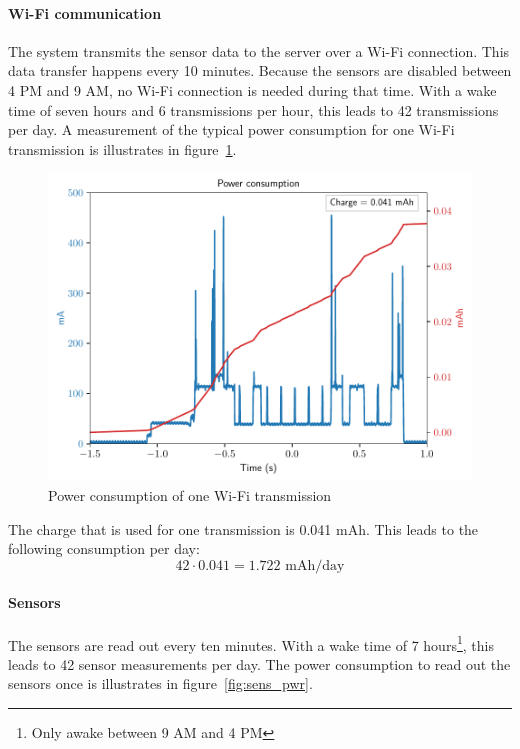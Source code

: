 \documentclass[11pt,a4paper]{article}
\begin{document}
\paragraph{Wi-Fi communication}
The system transmits the sensor data to the server over a Wi-Fi connection. This data transfer happens every 10 minutes. Because the sensors are disabled between 4 PM and 9 AM, no Wi-Fi connection is needed during that time. With a wake time of seven hours and 6 transmissions per hour, this leads to 42 transmissions per day. A measurement of the typical power consumption for one Wi-Fi transmission is illustrates in figure~\ref{fig:wifipwr}.
\begin{figure}[!ht]
	\centering
	\includegraphics[width=1.0\linewidth]{wifi_pwr.pdf}
	\caption{Power consumption of one Wi-Fi transmission}
	\label{fig:wifipwr}
\end{figure}
The charge that is used for one transmission is 0.041 mAh. This leads to the following consumption per day:
\begin{equation}
42 \cdot 0.041 = 1.722 \text{ mAh/day}
\end{equation}

\paragraph{Sensors}
The sensors are read out every ten minutes. With a wake time of 7 hours\footnote{Only awake between 9 AM and 4 PM}, this leads to 42 sensor measurements per day. The power consumption to read out the sensors once is illustrates in figure~\ref{fig:sens_pwr}.
\end{document}
